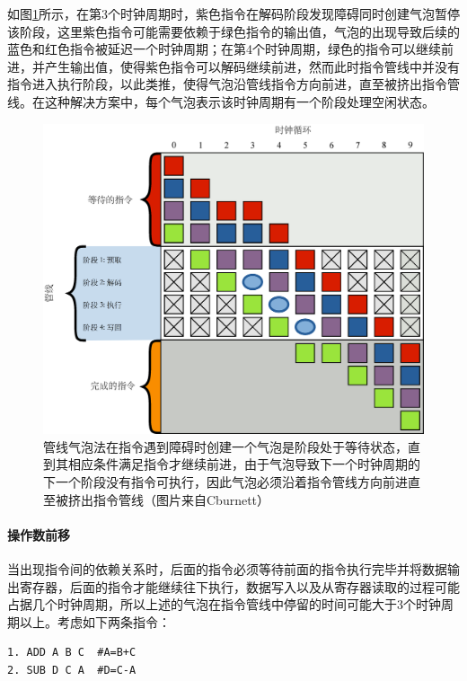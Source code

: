 如图\ref{f:rp-pipeline-bubble}所示，在第3个时钟周期时，紫色指令在解码阶段发现障碍同时创建气泡暂停该阶段，这里紫色指令可能需要依赖于绿色指令的输出值，气泡的出现导致后续的蓝色和红色指令被延迟一个时钟周期；在第4个时钟周期，绿色的指令可以继续前进，并产生输出值，使得紫色指令可以解码继续前进，然而此时指令管线中并没有指令进入执行阶段，以此类推，使得气泡沿管线指令方向前进，直至被挤出指令管线。在这种解决方案中，每个气泡表示该时钟周期有一个阶段处理空闲状态。

\begin{figure}
	\includegraphics[width=\textwidth]{figures/rp/Pipeline-bubble}
	\caption{管线气泡法在指令遇到障碍时创建一个气泡是阶段处于等待状态，直到其相应条件满足指令才继续前进，由于气泡导致下一个时钟周期的下一个阶段没有指令可执行，因此气泡必须沿着指令管线方向前进直至被挤出指令管线（图片来自Cburnett）}
	\label{f:rp-pipeline-bubble}
\end{figure}




\paragraph{操作数前移}
当出现指令间的依赖关系时，后面的指令必须等待前面的指令执行完毕并将数据输出寄存器，后面的指令才能继续往下执行，数据写入以及从寄存器读取的过程可能占据几个时钟周期，所以上述的气泡在指令管线中停留的时间可能大于3个时钟周期以上。考虑如下两条指令：

\begin{lstlisting}
1. ADD A B C  #A=B+C
2. SUB D C A  #D=C-A
\end{lstlisting}

